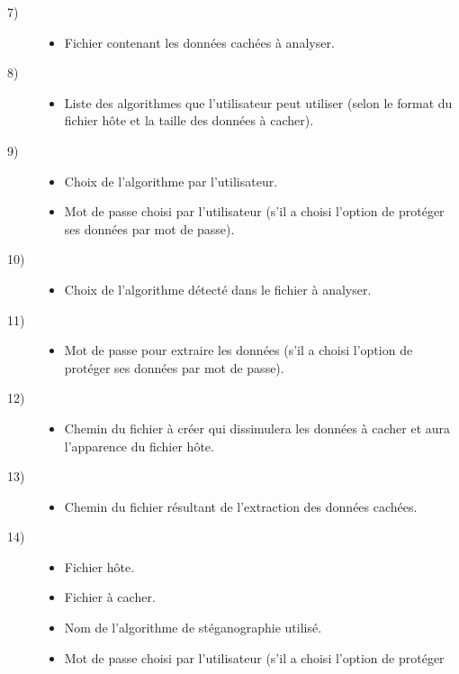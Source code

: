 \documentclass[11pt]{article}
\begin{document}
\begin{multicols}{2}
\begin{description}
\item[7)]
\begin{itemize}
\item Fichier contenant les données cachées à analyser.
\end{itemize}
\item[8)]
\begin{itemize}
\item Liste des algorithmes que l'utilisateur peut utiliser (selon le format du
    fichier hôte et la taille des données à cacher).
\end{itemize}
\item[9)]
\begin{itemize}
\item Choix de l'algorithme par l'utilisateur.
\item Mot de passe choisi par l'utilisateur (s'il a choisi l'option de protéger
    ses données par mot de passe).
\end{itemize}
\item[10)]
\begin{itemize}
\item Choix de l'algorithme détecté dans le fichier à analyser.
\end{itemize}
\item[11)]
\begin{itemize}
\item Mot de passe pour extraire les données (s'il a choisi l'option de
    protéger ses données par mot de passe).
\end{itemize}
\item[12)]
\begin{itemize}
\item Chemin du fichier à créer qui dissimulera les données à cacher et aura
    l'apparence du fichier hôte.
\end{itemize}
\item[13)]
\begin{itemize}
\item Chemin du fichier résultant de l'extraction des données cachées.
\end{itemize}
\item[14)]
\begin{itemize}
\item Fichier hôte.
\item Fichier à cacher.
\item Nom de l'algorithme de stéganographie utilisé.
\item Mot de passe choisi par l'utilisateur (s'il a choisi l'option de protéger

\end{itemize}
\end{description}
\end{multicols}
\end{document}
